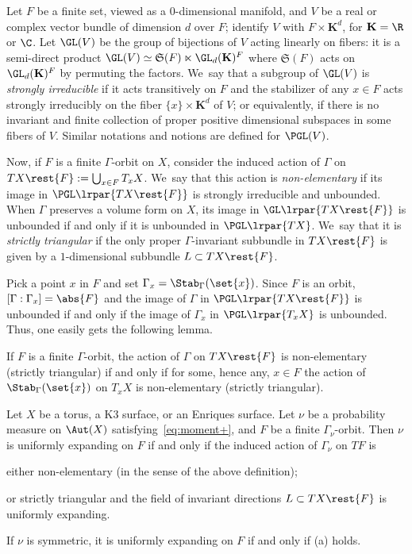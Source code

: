 Let $F$ be a finite set, viewed as a $0$-dimensional manifold, and $V$ be a real or complex vector bundle of dimension $d$ over $F$; identify
$V$ with $ F\times \mathbf{K}^d$, for ${\mathbf{K}} = \R$ or $\C$. Let $\GL(V)$ be the group of bijections of $V$ acting linearly on fibers: it is a semi-direct product $\GL(V) \simeq \mathfrak{S}(F) \ltimes \GL_d({\mathbf{K}})^F$ where $\mathfrak{S}(F)$ acts on
$\GL_d({\mathbf{K}})^F$ by permuting the factors. We~say that a subgroup of $\GL(V)$ is \emph{strongly irreducible} if it acts transitively on $F$
and the stabilizer of any $x\in F$ acts strongly irreducibly on the fiber $\{ x\} \times {\mathbf{K}}^d$ of $V$; or equivalently, if there is no invariant and finite collection of proper positive dimensional subspaces in some fibers of $V$. Similar notations and notions are defined for $\PGL(V)$.

Now, if $F$ is a finite $\Gamma$-orbit on $X$,
consider the induced action of $\Gamma$ on $TX\rest{F}:=\bigcup_{x\in F} T_x X$. We~say that this action is \emph{non-elementary}
if its image in $\PGL\lrpar{TX\rest{F}}$ is strongly irreducible and unbounded. When
$\Gamma$ preserves a volume form on $X$, its image in $\GL\lrpar{TX\rest{F}}$ is unbounded if and only if it is unbounded in $\PGL\lrpar{TX}$. We~say that it is \emph{strictly triangular} if the only proper $\Gamma$-invariant subbundle in $T X\rest{F}$ is given by a $1$-dimensional subbundle $L\subset TX\rest{F}$.

Pick a point $x$ in $F$ and set $\Gamma_x = \Stab_{\Gamma}(\set{x})$. Since $F$ is an orbit, $[\Gamma:\Gamma_x]=\abs{F}$ and the image of $\Gamma$ in $\PGL\lrpar{TX\rest{F}}$ is unbounded if and only if the image of $\Gamma_x$ in $\PGL\lrpar{T_xX}$ is unbounded. Thus, one easily gets the following lemma.

\begin{lem}\label{lem:stab_NE}
If $F$ is a finite $\Gamma$-orbit, the action of
$\Gamma$ on $TX\rest{F}$ is non-elementary (\resp strictly triangular) if and only if for some, hence any, $x\in F$
the action of $\Stab_{\Gamma}(\set{x})$ on $T_{x}X$ is non-elementary (\resp strictly triangular).
\end{lem}

\begin{thm}\label{thm:finite_UE}
Let $X$ be a torus, a K3 surface, or an Enriques surface. Let
$\nu$ be a probability measure on $\Aut(X)$ satisfying~\eqref{eq:moment+}, and $F$ be a finite $\Gamma_\nu$-orbit.
Then $\nu$ is uniformly expanding on $F$ if and only if the
induced action of $\Gamma_\nu$ on $TF$ is
\begin{enumeratea}
\item\label{thm:finite_UEa} either non-elementary (in the sense of the above definition);
\item\label{thm:finite_UEb} or strictly triangular and the field of invariant directions $L\subset TX\rest{F}$ is uniformly expanding.
\end{enumeratea}
If $\nu$ is symmetric, it is uniformly expanding on $F$ if and only if (a) holds.
\end{thm}

